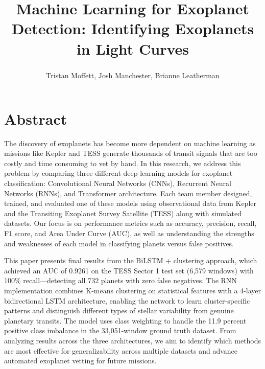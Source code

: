 \documentclass[letterpaper]{article} %
\title{Machine Learning for Exoplanet Detection: Identifying Exoplanets in Light Curves}
\author {
    Tristan Moffett\textsuperscript{\rm },
    Josh Manchester\textsuperscript{\rm },
    Brianne Leatherman\textsuperscript{\rm }
}
\begin{document}
\maketitle

\section*{Abstract}
The discovery of exoplanets has become more dependent on machine learning as missions like Kepler and TESS generate thousands of transit signals that are too costly and time consuming to vet by hand. In this research, we address this problem by comparing three different deep learning models for exoplanet classification: Convolutional Neural Networks (CNNs), Recurrent Neural Networks (RNNs), and Transformer architecture. Each team member designed, trained, and evaluated one of these models using observational data from Kepler and the Transiting Exoplanet Survey Satellite (TESS) along with simulated datasets. Our focus is on performance metrics such as accuracy, precision, recall, F1 score, and Area Under Curve (AUC), as well as understanding the strengths and weaknesses of each model in classifying planets versus false positives.

This paper presents final results from the BiLSTM + clustering approach, which achieved an AUC of 0.9261 on the TESS Sector 1 test set (6,579 windows) with 100\% recall---detecting all 732 planets with zero false negatives. The RNN implementation combines K-means clustering on statistical features with a 4-layer bidirectional LSTM architecture, enabling the network to learn cluster-specific patterns and distinguish different types of stellar variability from genuine planetary transits. The model uses class weighting to handle the 11.9 percent positive class imbalance in the 33,051-window ground truth dataset. From analyzing results across the three architectures, we aim to identify which methods are most effective for generalizability across multiple datasets and advance automated exoplanet vetting for future missions.
\end{document}
